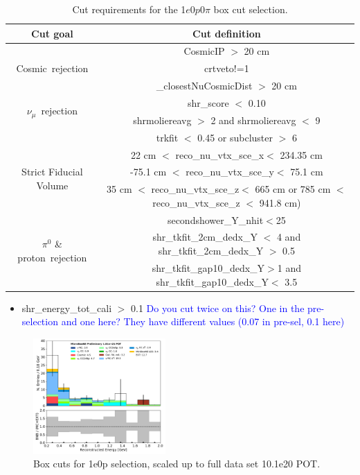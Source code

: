 \documentclass[a4paper]{article}
\newcommand{\zpsel}{1$e$0$p$0$\pi$ }
\begin{document}
\begin{table}[h!]
\centering
\setlength{\tabcolsep}{10pt}
\renewcommand{\arraystretch}{1.25}
 \begin{tabular}{| c | c |} 
 \hline
 Cut goal & Cut definition \\
 \hline\hline
\multirow{3}{*}{Cosmic~rejection} & CosmicIP $>$ 20 \si{\cm} \\
& crtveto!=1  \\ & \_closestNuCosmicDist $>$ 20 \si{\cm}\\
 \hline
\multirow{2}{*}{$\nu_\mu$~rejection} & shr\_score $<$ 0.10 \\ & shrmoliereavg $>$ 2 and shrmoliereavg $<$ 9\\ &trkfit $<$ 0.45 or subcluster $>$ 6\\
 \hline
\multirow{3}{*}{Strict Fiducial Volume} & 22 \si{\cm} $<$ reco\_nu\_vtx\_sce\_x$<$ 234.35 \si{\cm} \\
& -75.1 \si{\cm} $<$ reco\_nu\_vtx\_sce\_y$<$ 75.1 \si{\cm} \\ & 35 \si{\cm} $<$ reco\_nu\_vtx\_sce\_z$<$ 665 \si{\cm}  or 785 \si{\cm} $<$ reco\_nu\_vtx\_sce\_z $<$ 941.8 \si{\cm})\\
 \hline
 \multirow{3}{*}{$\pi^0$ \& proton~rejection} & secondshower\_Y\_nhit$<$25 \\ & shr\_tkfit\_2cm\_dedx\_Y $<$ 4 and shr\_tkfit\_2cm\_dedx\_Y $>$ 0.5 \\ & shr\_tkfit\_gap10\_dedx\_Y$>$1 and shr\_tkfit\_gap10\_dedx\_Y$<$ 3.5\\
 \hline
 \end{tabular}
 \caption{\label{tab:1e0p:cutbased} Cut requirements for the \zpsel box cut selection.}
\end{table}


\begin{itemize}
    \item shr\_energy\_tot\_cali $>$ 0.1 \textcolor{blue}{Do you cut twice on this? One in the pre-selection and one here? They have different values (0.07 in pre-sel, 0.1 here)}
\end{itemize}

\begin{figure}[H]
\begin{center}
\includegraphics[width=0.45\textwidth]{1e0p/reco_e_01162020_RUN3.pdf}
\caption{\label{fig:1e0p:cutbased:RUN3} Box cuts for 1e0p selection, scaled up to full data set 10.1e20 POT.}
\end{center}
\end{figure}
\end{document}
